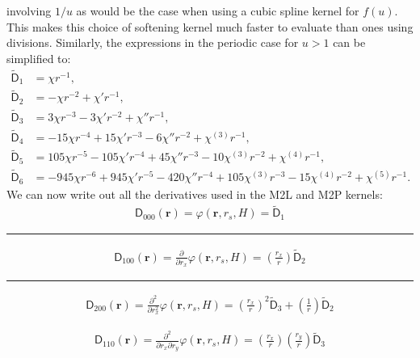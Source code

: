 involving $1/u$ as would be the case when using a cubic spline kernel for
$f(u)$. This makes this choice of softening kernel much faster to evaluate than
ones using divisions. Similarly, the expressions in the periodic case for $u>1$
can be simplified to:
\begin{align}
  \mathsf{\tilde{D}}_{1} &= \chi r^{-1}, \nonumber \\
  \mathsf{\tilde{D}}_{2} &= -\chi r^{-2} + \chi' r^{-1}, \nonumber \\
  \mathsf{\tilde{D}}_{3} &= 3\chi r^{-3} - 3\chi' r^{-2} + \chi'' r^{-1}, \nonumber \\
  \mathsf{\tilde{D}}_{4} &= -15\chi r^{-4} + 15\chi' r^{-3} - 6\chi''r^{-2} + \chi^{(3)} r^{-1}, \nonumber \\
  \mathsf{\tilde{D}}_{5} &= 105\chi r^{-5} -105\chi' r^{-4} + 45\chi''r^{-3} - 10\chi^{(3)} r^{-2} + \chi^{(4)} r^{-1}\nonumber, \\
  \mathsf{\tilde{D}}_{6} &= -945\chi r^{-6} + 945 \chi' r^{-5} -420 \chi'' r^{-4} + 105 \chi^{(3)} r^{-3} - 15\chi^{(4)} r^{-2} +  \chi^{(5)} r^{-1}. \nonumber
\end{align}
We can now write out all the derivatives used in the M2L and
M2P kernels:
\begin{align}
  \mathsf{D}_{000}(\mathbf{r}) = \varphi (\mathbf{r}, r_s, H) =
    \mathsf{\tilde{D}}_{1} \nonumber
\end{align}

\noindent\rule{6cm}{0.4pt}
\begin{align}
  \mathsf{D}_{100}(\mathbf{r}) = \frac{\partial}{\partial r_x} \varphi (\mathbf{r}, r_s, H) =
    \left(\frac{r_x}{r}\right) \mathsf{\tilde{D}}_{2} \nonumber
\end{align}

\noindent\rule{6cm}{0.4pt}
\begin{align}
\mathsf{D}_{200}(\mathbf{r}) = \frac{\partial^2}{\partial r_x^2} \varphi (\mathbf{r}, r_s, H) = 
\left(\frac{r_x}{r}\right)^2 \mathsf{\tilde{D}}_{3} + \left(\frac{1}{r}\right)\mathsf{\tilde{D}}_{2}\nonumber
\end{align}

\begin{align}
\mathsf{D}_{110}(\mathbf{r}) = \frac{\partial^2}{\partial r_x\partial r_y} \varphi (\mathbf{r}, r_s, H) =
\left(\frac{r_x}{r}\right) \left(\frac{r_y}{r}\right)  \mathsf{\tilde{D}}_{3} \nonumber
\end{align}

